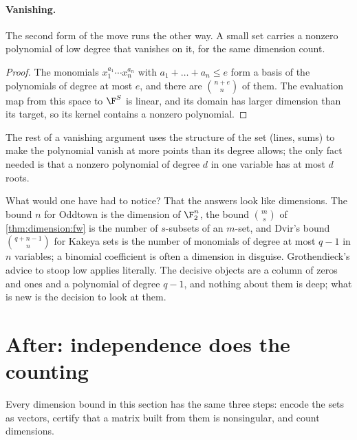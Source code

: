 \begin{refsection}
\paragraph{Vanishing.} The second form of the move runs the other way. A small set carries a nonzero polynomial of low degree that vanishes on it, for the same dimension count.


\begin{proof}
The monomials $x_1^{a_1}\cdots x_n^{a_n}$ with $a_1+\dots+a_n\le e$ form a basis of the polynomials of degree at most $e$, and there are $\binom{n+e}{n}$ of them. The evaluation map from this space to $\F^S$ is linear, and its domain has larger dimension than its target, so its kernel contains a nonzero polynomial.
\end{proof}

The rest of a vanishing argument uses the structure of the set (lines, sums) to make the polynomial vanish at more points than its degree allows; the only fact needed is that a nonzero polynomial of degree $d$ in one variable has at most $d$ roots.

What would one have had to notice? That the answers look like dimensions. The bound $n$ for Oddtown is the dimension of $\F_2^n$, the bound $\binom ms$ of \cref{thm:dimension:fw} is the number of $s$-subsets of an $m$-set, and Dvir's bound $\binom{q+n-1}{n}$ for Kakeya sets is the number of monomials of degree at most $q-1$ in $n$ variables; a binomial coefficient is often a dimension in disguise. Grothendieck's advice to stoop low applies literally. The decisive objects are a column of zeros and ones and a polynomial of degree $q-1$, and nothing about them is deep; what is new is the decision to look at them.

\section{After: independence does the counting}\label{sec:dimension:after-independence}

Every dimension bound in this section has the same three steps: encode the sets as vectors, certify that a matrix built from them is nonsingular, and count dimensions.


\end{refsection}
